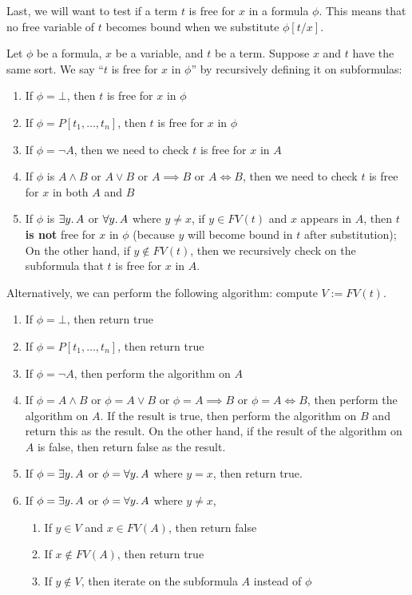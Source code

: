 \begin{node}
Last, we will want to test if a term $t$ is free for $x$ in a formula
$\phi$. This means that no free variable of $t$ becomes bound when we
substitute $\phi[t/x]$.
\end{node}

\begin{node}
Let $\phi$ be a formula, $x$ be a variable, and $t$ be a term. Suppose
$x$ and $t$ have the same sort. We say ``$t$ is free for $x$ in $\phi$''
by recursively defining it on subformulas:
\begin{enumerate}
\item If $\phi=\bot$, then $t$ is free for $x$ in $\phi$
\item If $\phi=P[t_{1},\dots,t_{n}]$, then $t$ is free for $x$ in $\phi$
\item If $\phi=\neg A$, then we need to check $t$ is free for $x$ in $A$
\item If $\phi$ is $A\land B$ or $A\lor B$ or $A\implies B$ or $A\iff B$,
  then we need to check $t$ is free for $x$ in both $A$ and $B$
\item If $\phi$ is $\exists y\ldotp A$ or $\forall y\ldotp A$ where
  $y\neq x$, if
  $y\in FV(t)$ and $x$ appears in $A$, then $t$ \textbf{is not} free
  for $x$ in $\phi$ (because $y$ will become bound in $t$ after substitution);
On the other hand, if $y\notin FV(t)$, then we recursively check on
the subformula that $t$ is free for $x$ in $A$.
\end{enumerate}
Alternatively, we can perform the following algorithm: compute $V:=FV(t)$.
\begin{enumerate}
\item If $\phi=\bot$, then return true
\item If $\phi=P[t_{1},\dots,t_{n}]$, then return true
\item If $\phi=\neg A$, then perform the algorithm on $A$
\item If $\phi=A\land B$ or $\phi=A\lor B$ or $\phi=A\implies B$ or
  $\phi=A\iff B$, then perform the algorithm on $A$. If the result is
  true, then perform the algorithm on $B$ and return this as the
  result. On the other hand, if the result of the algorithm on $A$ is
  false, then return false as the result.
\item If $\phi=\exists y\ldotp A$ or $\phi=\forall y\ldotp A$ where
  $y=x$, then return true.
\item If $\phi=\exists y\ldotp A$ or $\phi=\forall y\ldotp A$ where
  $y\neq x$,
  \begin{enumerate}
  \item If $y\in V$ and $x\in FV(A)$, then return false
  \item If $x\notin FV(A)$, then return true
  \item If $y\notin V$, then iterate on the subformula $A$ instead of $\phi$
  \end{enumerate}
\end{enumerate}
\end{node}


